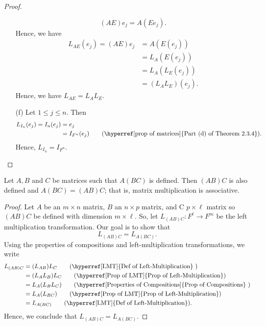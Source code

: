 \begin{proof}
\begin{enumerate}
            \[  (AE){e}_{j} = A(E {e}_{j}). \]
            Hence, we have
            \begin{align*}  {L}_{AE}({e}_{j}) = (AE) {e}_{j} &= A(E({e}_{j})) \\ 
            &= {L}_{A}(E({e}_{j})) \\ 
            &= {L}_{A} ({L}_{E}({e}_{j})) \\ 
            &= ({L}_{A}{L}_{E})({e}_{j}).
            \end{align*}
            Hence, we have \( {L}_{AE} = {L}_{A} {L}_{E} \).
        \item[(f)] Let \( 1 \leq j \leq n  \). Then
                \begin{align*}  {L}_{{I}_{n}}({e}_{j}) = {I}_{n}({e}_{j}) 
                &= {e}_{j} \\ 
                &= {I}_{F^{n}}({e}_{j}) \tag{{\hyperref[prop of matrices]{Part (d) of Theorem 2.3.4}}}. 
                \end{align*}
            Hence, \( {L}_{{I}_{n}} = {I}_{F^{n}} \).
   \end{enumerate}
\end{proof}

\begin{theorem}
Let \( A, B  \) and \( C  \) be matrices such that \( A(BC) \) is defined. Then \( (AB)C  \) is also defined and \( A(BC) = (AB)C  \); that is, matrix multiplication is associative.    
\end{theorem}
\begin{proof}
Let \( A  \) be an \( m \times n  \) matrix, \( B  \) an \(  n \times p  \) matrix, and C \( p \times \ell  \) matrix so \( (AB)C \) be defined with dimension \( m \times \ell  \). So, let \( {L}_{(AB)C}: F^{\ell} \to F^{m}   \) be the left multiplication transformation. Our goal is to show that
\[ {L}_{(AB)C} = {L}_{A(BC)}. \]
Using the properties of compositions and left-multiplication transformations, we write 
\begin{align*} 
    {L}_{(AB)C}                  &= ({L}_{AB}) {L}_{C} \tag{{\hyperref[LMT]{Def of Left-Multiplication}} }   \\
                                 &= ( {L}_{A} {L}_{B} )  {L}_{C} \tag{{\hyperref[Prop of LMT]{Prop of Left-Multiplication}}} \\ 
                                 &= {L}_{A} ({L}_{B} {L}_{C}) \tag{{\hyperref[Properties of Compositions]{Prop of Compositions}} } \\ 
                                 &= {L}_{A} ({L}_{BC}) \tag{{\hyperref[Prop of LMT]{Prop of Left-Multiplication}}} \\ 
                                 &=  {L}_{A(BC)} \tag{{\hyperref[LMT]{Def of Left-Multiplication}}}.       
\end{align*}
Hence, we conclude that \( {L}_{(AB)C} = {L}_{A(BC)} \).
\end{proof}
